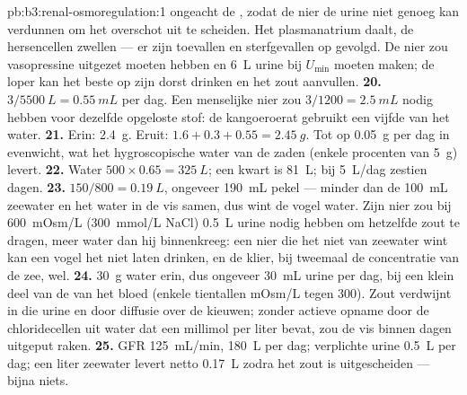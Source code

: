 \begin{solution}{pb:b3:renal-osmoregulation:1}
ongeacht de , zodat de nier de urine niet genoeg kan
verdunnen om het overschot uit te scheiden. Het plasmanatrium daalt, de
hersencellen zwellen --- er zijn toevallen en sterfgevallen op gevolgd.
De nier zou vasopressine uitgezet moeten hebben en \qty{6}{L} urine bij
$U_{\min}$ moeten maken; de loper kan het beste op zijn dorst drinken
en het zout aanvullen.
\textbf{20.} $3/5500\ \unit{L} = \qty{0.55}{mL}$ per dag. Een menselijke
nier zou $3/1200 = \qty{2.5}{mL}$ nodig hebben voor dezelfde opgeloste
stof: de kangoeroerat gebruikt een vijfde van het water.
\textbf{21.} Erin: \qty{2.4}{g}. Eruit: $1.6 + 0.3 + 0.55 = \qty{2.45}{g}$.
Tot op \qty{0.05}{g} per dag in evenwicht, wat het hygroscopische water
van de zaden (enkele procenten van \qty{5}{g}) levert.
\textbf{22.} Water $500\times 0.65 = \qty{325}{L}$; een kwart is
\qty{81}{L}; bij \qty{5}{L/dag} zestien dagen.
\textbf{23.} $150/800 = \qty{0.19}{L}$, ongeveer \qty{190}{mL} pekel
--- minder dan de \qty{100}{mL} zeewater en het water in de vis samen,
dus wint de vogel water. Zijn nier zou bij \qty{600}{mOsm/L}
(\qty{300}{mmol/L} NaCl) \qty{0.5}{L} urine nodig hebben om hetzelfde
zout te dragen, meer water dan hij binnenkreeg: een nier die het niet
van zeewater wint kan een vogel het niet laten drinken, en de klier,
bij tweemaal de concentratie van de zee, wel.
\textbf{24.} \qty{30}{g} water erin, dus ongeveer \qty{30}{mL} urine per
dag, bij een klein deel van de  van het bloed (enkele
tientallen mOsm/L tegen \num{300}). Zout verdwijnt in die urine en door
diffusie over de kieuwen; zonder actieve opname door de chloridecellen
uit water dat een millimol per liter bevat, zou de vis binnen dagen
uitgeput raken.
\textbf{25.} GFR \qty{125}{mL/min}, \qty{180}{L} per dag; verplichte
urine \qty{0.5}{L} per dag; een liter zeewater levert netto
\qty{0.17}{L} zodra het zout is uitgescheiden --- bijna niets.
\end{solution}
